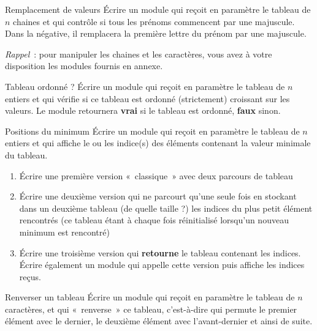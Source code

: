 \begin{Exercice}{Remplacement de valeurs}
	Écrire un module qui reçoit en paramètre le tableau
	 de $n$ chaines et qui
	contrôle si tous les prénoms commencent par une majuscule.
	Dans la négative, il remplacera la première lettre du prénom 
	par une majuscule.
	
	\textit{Rappel}~: pour manipuler les chaines et les caractères,
	vous avez à votre disposition les modules fournis en annexe.
\end{Exercice}

\begin{Exercice}{Tableau ordonné ?}
	Écrire un module qui reçoit en paramètre le tableau
	 de $n$ entiers et qui
	vérifie si ce tableau est ordonné (strictement) croissant sur les
	valeurs. Le module retournera \textbf{vrai} si le tableau est ordonné,
	\textbf{faux} sinon.
\end{Exercice}

\begin{Exercice}{Positions du minimum}
	Écrire un module qui reçoit en paramètre le tableau
	 de $n$ entiers et qui
	affiche le ou les indice(s) des éléments contenant la valeur minimale
	du tableau.

	\begin{enumerate}[label=\alph*)]
	\item 
		Écrire une première version «~classique~» avec deux parcours de tableau
	\item
		Écrire une deuxième version qui ne parcourt qu’une seule fois 
		 en
		stockant dans un deuxième tableau (de quelle taille ?)
		les indices du plus petit élément
		rencontrés (ce tableau étant à chaque fois réinitialisé lorsqu’un
		nouveau minimum est rencontré)
	\item
		Écrire une troisième version qui \textbf{retourne} 
		le tableau contenant les indices.
		Écrire également un module qui appelle cette version
		puis affiche les indices reçus. 
	\end{enumerate}
\end{Exercice}

\begin{Exercice}{Renverser un tableau}
	Écrire un module qui reçoit en paramètre le tableau
	 de $n$ caractères, et qui
	«~renverse~» ce tableau, c’est-à-dire qui permute le premier élément
	avec le dernier, le deuxième élément avec l’avant-dernier et ainsi de
	suite.
\end{Exercice}

